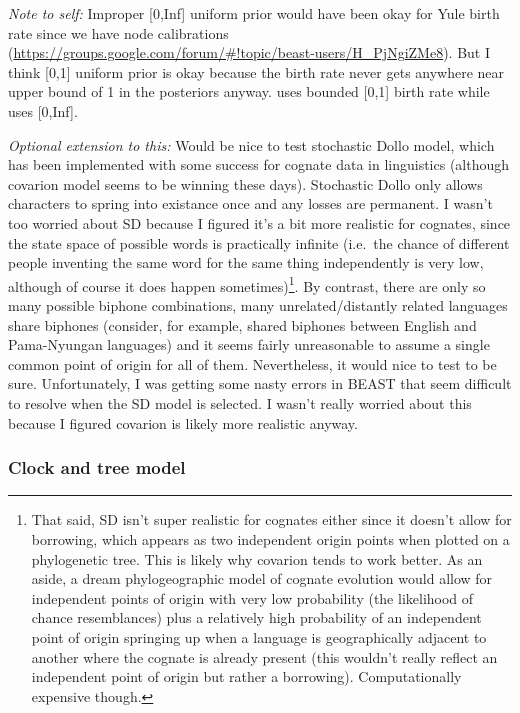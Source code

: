 \emph{Note to self:} Improper {[}0,Inf{]} uniform prior would have been okay for Yule birth rate since we have node calibrations (\url{https://groups.google.com/forum/\#!topic/beast-users/H_PjNgiZMe8}). But I think {[}0,1{]} uniform prior is okay because the birth rate never gets anywhere near upper bound of 1 in the posteriors anyway. \textcite{kolipakam_bayesian_2018} uses bounded {[}0,1{]} birth rate while \textcite{bouckaert_origin_2018} uses {[}0,Inf{]}.

\emph{Optional extension to this:} Would be nice to test stochastic Dollo model, which has been implemented with some success for cognate data in linguistics (although covarion model seems to be winning these days). Stochastic Dollo only allows characters to spring into existance once and any losses are permanent. I wasn't too worried about SD because I figured it's a bit more realistic for cognates, since the state space of possible words is practically infinite (i.e.~the chance of different people inventing the same word for the same thing independently is very low, although of course it does happen sometimes)\footnote{That said, SD isn't super realistic for cognates either since it doesn't allow for borrowing, which appears as two independent origin points when plotted on a phylogenetic tree. This is likely why covarion tends to work better. As an aside, a dream phylogeographic model of cognate evolution would allow for independent points of origin with very low probability (the likelihood of chance resemblances) plus a relatively high probability of an independent point of origin springing up when a language is geographically adjacent to another where the cognate is already present (this wouldn't really reflect an independent point of origin but rather a borrowing). Computationally expensive though.}. By contrast, there are only so many possible biphone combinations, many unrelated/distantly related languages share biphones (consider, for example, shared biphones between English and Pama-Nyungan languages) and it seems fairly unreasonable to assume a single common point of origin for all of them. Nevertheless, it would nice to test to be sure. Unfortunately, I was getting some nasty errors in BEAST that seem difficult to resolve when the SD model is selected. I wasn't really worried about this because I figured covarion is likely more realistic anyway.

\hypertarget{clock-and-tree-model}{%
\subsubsection{Clock and tree model}\label{clock-and-tree-model}}

